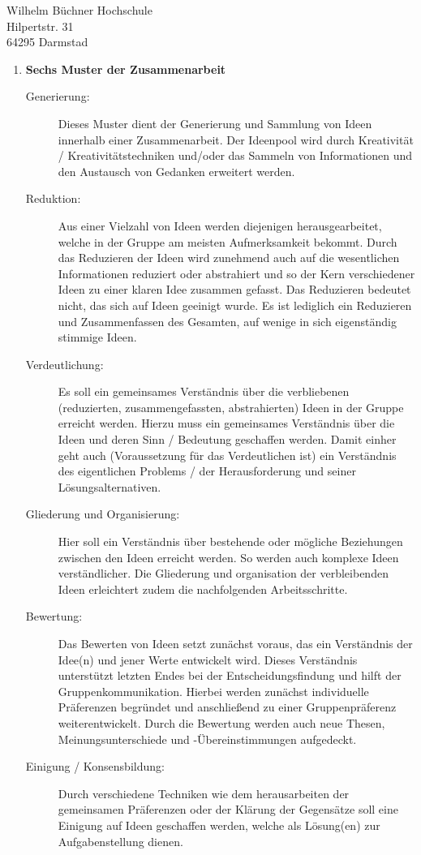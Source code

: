 \documentclass[
    version=last,           %
    DIV=13,                 %
    BCOR=0mm,               %
    paper=a4,               %
    fontsize=12pt,          %
    firsthead=on,           %
    firstfoot=on,           %
    pagenumber=on,i         %
    parskip=half,           %
    enlargefirstpage=,      %
    firsthead=on,           %
    fromrule=afteraddress,  %
    priority=off,           %
    backaddress=true,       %
    refline=dateright,      %
	fromalign=right,	    %
    fromemail=on,i          %
    fromurl=on,             %
    frombank=on,
    fromphone=on,           %
    frommobilephone=on      %
    fromlogo=on,            %
    addrfield=on,           %
    subject=untitled,  %
    foldmarks=off,          %
    numericaldate=off,      %
	pagenumber=right,	        %
	parskip=half,	        %
    headsep=false,          %
    footsepline=true,       %
    foldmarks=off,		    %
	]{scrlttr2}
\begin{document}
\begin{letter} {Wilhelm Büchner Hochschule \\
Hilpertstr. 31\\
64295 Darmstad}
\begin{itemize}
\begin{enumerate}
            \vspace{1cm}
        \item \textbf{Sechs Muster der Zusammenarbeit}
            \begin{description}
        \item[Generierung:] Dieses Muster dient der Generierung und Sammlung von
            Ideen innerhalb einer Zusammenarbeit. Der Ideenpool wird durch
            Kreativität / Kreativitätstechniken und/oder das Sammeln von
            Informationen und den Austausch von Gedanken erweitert werden.
        \item [Reduktion:] Aus einer Vielzahl von Ideen werden diejenigen
            herausgearbeitet, welche in der Gruppe am meisten Aufmerksamkeit
            bekommt. Durch das Reduzieren der Ideen wird zunehmend auch auf
            die wesentlichen Informationen reduziert oder abstrahiert und so der
            Kern verschiedener Ideen zu einer klaren Idee zusammen gefasst. Das
            Reduzieren bedeutet nicht, das sich auf Ideen geeinigt wurde. Es ist
            lediglich ein Reduzieren und Zusammenfassen des Gesamten, auf wenige
            in sich eigenständig stimmige Ideen.
        \item [Verdeutlichung:]
            Es soll ein gemeinsames Verständnis über die verbliebenen
            (reduzierten, zusammengefassten, abstrahierten) Ideen in der Gruppe
            erreicht werden. Hierzu muss ein gemeinsames Verständnis über die
            Ideen und deren Sinn / Bedeutung geschaffen werden. Damit einher
            geht auch (Voraussetzung für das Verdeutlichen ist) ein Verständnis
            des eigentlichen Problems / der Herausforderung und seiner
            Lösungsalternativen.
        \item [Gliederung und Organisierung:]
            Hier soll ein Verständnis über bestehende oder mögliche Beziehungen
            zwischen den Ideen erreicht werden. So werden auch komplexe Ideen
            verständlicher. Die Gliederung und organisation der verbleibenden
            Ideen erleichtert zudem die nachfolgenden Arbeitsschritte.
        \item [Bewertung:]
            Das Bewerten von Ideen setzt zunächst voraus, das ein Verständnis
            der Idee(n) und jener Werte entwickelt wird. Dieses Verständnis
            unterstützt letzten Endes bei der Entscheidungsfindung und hilft der
            Gruppenkommunikation. Hierbei werden zunächst individuelle
            Präferenzen begründet und anschließend zu einer Gruppenpräferenz
            weiterentwickelt. Durch die Bewertung werden auch neue Thesen,
            Meinungsunterschiede und -Übereinstimmungen aufgedeckt.
         \item [Einigung / Konsensbildung:]
             Durch verschiedene Techniken wie dem herausarbeiten der
             gemeinsamen Präferenzen oder der Klärung der Gegensätze soll eine
             Einigung auf Ideen geschaffen werden, welche als Lösung(en) zur
             Aufgabenstellung dienen.
            \end{description}


\end{enumerate}
\end{itemize}
\end{letter}
\end{document}
